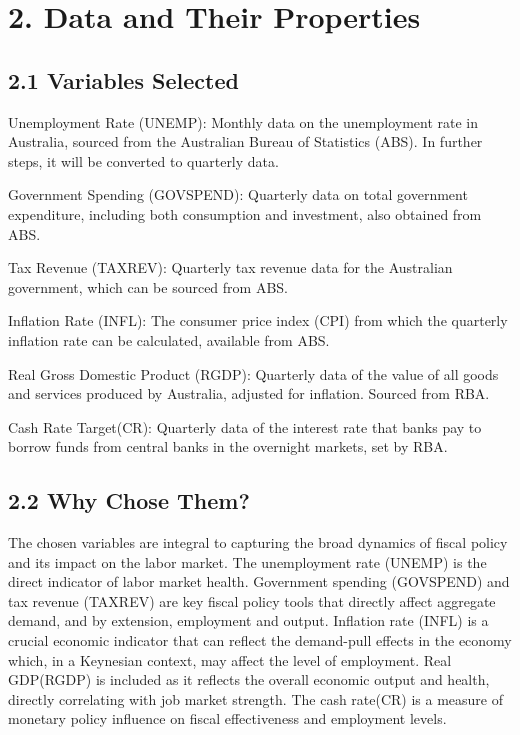 \documentclass[
  letterpaper,
  DIV=11,
  numbers=noendperiod]{scrartcl}
\begin{document}
\hypertarget{data-and-their-properties}{%
\section{2. Data and Their Properties}\label{data-and-their-properties}}

\hypertarget{variables-selected}{%
\subsection{2.1 Variables Selected}\label{variables-selected}}

Unemployment Rate (UNEMP): Monthly data on the unemployment rate in
Australia, sourced from the Australian Bureau of Statistics (ABS). In
further steps, it will be converted to quarterly data.

Government Spending (GOVSPEND): Quarterly data on total government
expenditure, including both consumption and investment, also obtained
from ABS.

Tax Revenue (TAXREV): Quarterly tax revenue data for the Australian
government, which can be sourced from ABS.

Inflation Rate (INFL): The consumer price index (CPI) from which the
quarterly inflation rate can be calculated, available from ABS.

Real Gross Domestic Product (RGDP): Quarterly data of the value of all
goods and services produced by Australia, adjusted for inflation.
Sourced from RBA.

Cash Rate Target(CR): Quarterly data of the interest rate that banks pay
to borrow funds from central banks in the overnight markets, set by RBA.

\hypertarget{why-chose-them}{%
\subsection{2.2 Why Chose Them?}\label{why-chose-them}}

The chosen variables are integral to capturing the broad dynamics of
fiscal policy and its impact on the labor market. The unemployment rate
(UNEMP) is the direct indicator of labor market health. Government
spending (GOVSPEND) and tax revenue (TAXREV) are key fiscal policy tools
that directly affect aggregate demand, and by extension, employment and
output. Inflation rate (INFL) is a crucial economic indicator that can
reflect the demand-pull effects in the economy which, in a Keynesian
context, may affect the level of employment. Real GDP(RGDP) is included
as it reflects the overall economic output and health, directly
correlating with job market strength. The cash rate(CR) is a measure of
monetary policy influence on fiscal effectiveness and employment levels.
\end{document}

